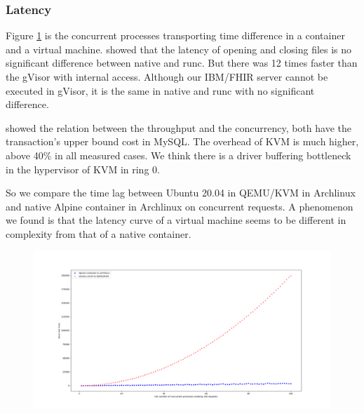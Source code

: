 \subsubsection{Latency}
Figure \ref{conc} is the concurrent processes transporting time
difference in a container and a virtual machine.
\textcite{234857} showed that the latency of opening and closing files
is no significant difference between native and runc. But there was 12 times
faster than the gVisor with internal access. Although our IBM/FHIR server
cannot be executed in gVisor, it is the same in native and runc with no
significant difference.

\textcite{7095802} showed the relation between the throughput and the concurrency,
both have the transaction's upper bound cost in MySQL. The overhead of KVM is
much higher, above 40\% in all measured cases. We think there is a driver
buffering bottleneck in the hypervisor of KVM in ring 0.

So we compare the time lag between Ubuntu 20.04 in QEMU/KVM in Archlinux
and native Alpine container in Archlinux on concurrent requests.
A phenomenon we found is that the latency curve of a virtual
machine seems to be different in complexity from that of a native container.

\begin{figure}
    \centering
    \includegraphics[width=.5\textwidth]{src/concurrent.png}
    \label{conc}
\end{figure}

